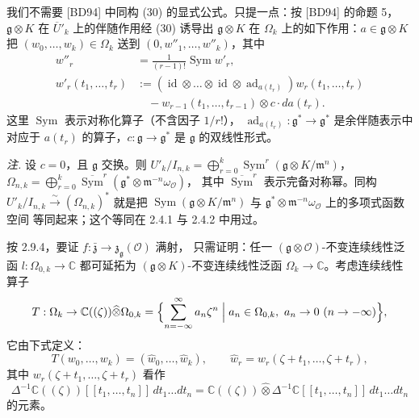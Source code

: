我们不需要 [BD94] 中同构 (30) 的显式公式。只提一点：按 [BD94] 的命题 5，
$\mathfrak{g}\otimes K$ 在 $\overline{U}'_k$ 上的伴随作用经 (30) 诱导出
$\mathfrak{g}\otimes K$ 在 $\Omega_k$ 上的如下作用：$a\in\mathfrak{g}\otimes K$
把 $(w_0,\ldots,w_k)\in\Omega_k$ 送到 $(0,w''_1,\ldots,w''_k)$，其中
\[
\begin{aligned}
w''_r&=\frac{1}{(r-1)!}\operatorname{Sym} w'_r,\\
w'_r(t_1,\ldots,t_r)&:=(\operatorname{id}\otimes\ldots\otimes\operatorname{id}
  \otimes\operatorname{ad}_{a(t_r)})w_r(t_1,\ldots,t_r)\\
&\quad-w_{r-1}(t_1,\ldots,t_{r-1})\otimes c\cdot da(t_r).
\end{aligned}
\]
这里 $\operatorname{Sym}$ 表示对称化算子（不含因子 $1/r!$），
$\operatorname{ad}_{a(t_r)}:\mathfrak{g}^*\to\mathfrak{g}^*$ 是余伴随表示中
对应于 $a(t_r)$ 的算子，$c:\mathfrak{g}\to\mathfrak{g}^*$ 是 $\mathfrak{g}$
的双线性形式。

\emph{注.} 设 $c=0$，且 $\mathfrak{g}$ 交换。则
$U'_k/I_{n,k}=\bigoplus_{r=0}^k\operatorname{Sym}^r(\mathfrak{g}\otimes K/\mathfrak{m}^n)$，
$\Omega_{n,k}=\bigoplus_{r=0}^k\overline{\operatorname{Sym}}^r
(\mathfrak{g}^*\otimes\mathfrak{m}^{-n}\omega_{\mathcal{O}})$，
其中 $\overline{\operatorname{Sym}}^r$ 表示完备对称幂。同构
$U'_k/I_{n,k}\xrightarrow{\sim}(\Omega_{n,k})^*$ 就是把
$\operatorname{Sym}(\mathfrak{g}\otimes K/\mathfrak{m}^n)$ 与
$\mathfrak{g}^*\otimes\mathfrak{m}^{-n}\omega_{\mathcal{O}}$ 上的多项式函数空间
等同起来；这个等同在 2.4.1 与 2.4.2 中用过。

 按 2.9.4，要证
$f:\bar{\mathfrak{z}}\to\mathfrak{z}_{\mathfrak{g}}(\mathcal{O})$ 满射，
只需证明：任一 $(\mathfrak{g}\otimes\mathcal{O})$-不变连续线性泛函
$l:\Omega_{0,k}\to\mathbb{C}$ 都可延拓为 $(\mathfrak{g}\otimes K)$-不变连续线性泛函
$\Omega_k\to\mathbb{C}$。考虑连续线性算子
\[
T:\Omega_k\to\mathbb{C}((\zeta))\widehat{\otimes}\Omega_{0,k}
=\Bigl\{\sum_{n=-\infty}^{\infty}a_n\zeta^n
\Bigm| a_n\in\Omega_{0,k},\ a_n\to 0\ (n\to-\infty)\Bigr\},
\]
它由下式定义：
\begin{equation}\tag{32}
T(w_0,\ldots,w_k)=(\widehat{w}_0,\ldots,\widehat{w}_k),\qquad
\widehat{w}_r=w_r(\zeta+t_1,\ldots,\zeta+t_r),
\end{equation}
其中 $w_r(\zeta+t_1,\ldots,\zeta+t_r)$ 看作
\[
\Delta^{-1}\mathbb{C}((\zeta))[[t_1,\ldots,t_n]]\,dt_1\ldots dt_n
=\mathbb{C}((\zeta))\widehat{\otimes}\Delta^{-1}\mathbb{C}[[t_1,\ldots,t_n]]
\,dt_1\ldots dt_n
\]
的元素。

